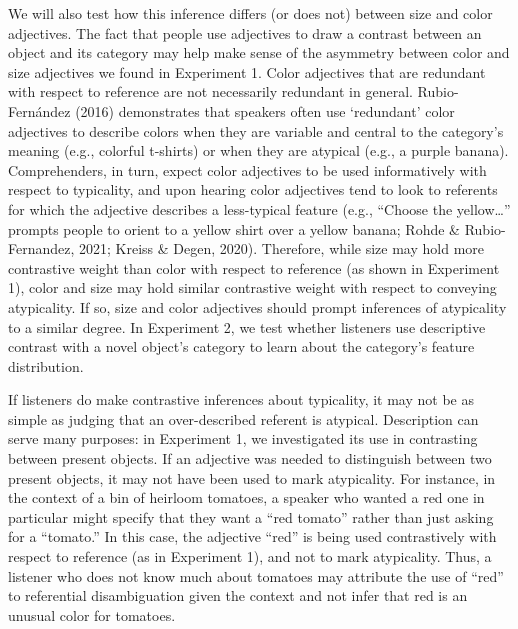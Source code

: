 \documentclass[
  english,
  man,floatsintext]{apa6}
\begin{document}
We will also test how this inference differs (or does not) between size and color adjectives. The fact that people use adjectives to draw a contrast between an object and its category may help make sense of the asymmetry between color and size adjectives we found in Experiment 1. Color adjectives that are redundant with respect to reference are not necessarily redundant in general. Rubio-Fernández (2016) demonstrates that speakers often use `redundant' color adjectives to describe colors when they are variable and central to the category's meaning (e.g., colorful t-shirts) or when they are atypical (e.g., a purple banana). Comprehenders, in turn, expect color adjectives to be used informatively with respect to typicality, and upon hearing color adjectives tend to look to referents for which the adjective describes a less-typical feature (e.g., ``Choose the yellow\ldots'' prompts people to orient to a yellow shirt over a yellow banana; Rohde \& Rubio-Fernandez, 2021; Kreiss \& Degen, 2020). Therefore, while size may hold more contrastive weight than color with respect to reference (as shown in Experiment 1), color and size may hold similar contrastive weight with respect to conveying atypicality. If so, size and color adjectives should prompt inferences of atypicality to a similar degree. In Experiment 2, we test whether listeners use descriptive contrast with a novel object's category to learn about the category's feature distribution.

If listeners do make contrastive inferences about typicality, it may not be as simple as judging that an over-described referent is atypical. Description can serve many purposes: in Experiment 1, we investigated its use in contrasting between present objects. If an adjective was needed to distinguish between two present objects, it may not have been used to mark atypicality. For instance, in the context of a bin of heirloom tomatoes, a speaker who wanted a red one in particular might specify that they want a ``red tomato'' rather than just asking for a ``tomato.'' In this case, the adjective ``red'' is being used contrastively with respect to reference (as in Experiment 1), and not to mark atypicality. Thus, a listener who does not know much about tomatoes may attribute the use of ``red'' to referential disambiguation given the context and not infer that red is an unusual color for tomatoes.
\end{document}
